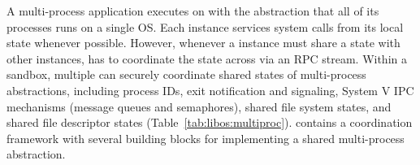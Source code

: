 \label{sec:libos:namespaces}



A multi-process application executes on \graphene{} 
with the abstraction that all of its processes runs on a single OS.
Each \thelibos{} instance services system calls
from its local state whenever possible.
However, whenever a \thelibos{} instance must share a \libos{} state with other instances,
\thelibos{} has to coordinate the state across \picoprocs{}
via an RPC stream.
Within a sandbox, multiple \picoprocs{} 
can securely coordinate shared states of multi-process abstractions, including process IDs, exit notification and signaling, 
System V IPC mechanisms (message queues and semaphores), shared file system states, and shared file descriptor states (Table~\ref{tab:libos:multiproc}).
\thelibos{} contains a coordination framework
with several building blocks for implementing a shared multi-process abstraction.

